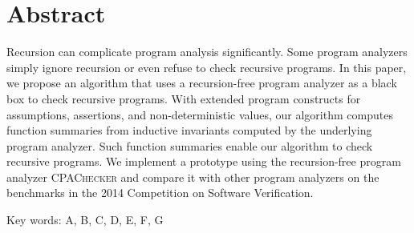 
\chapter{Abstract}

Recursion can complicate program analysis significantly. 
Some program analyzers simply ignore recursion or even refuse
to check recursive programs. In this paper, we propose an algorithm that uses
a recursion-free program analyzer as a black box to check recursive
programs. With extended program constructs for assumptions,
assertions, and non-deterministic values, our algorithm computes
function summaries from inductive invariants computed by the
underlying program analyzer. Such function summaries enable our
algorithm to check recursive programs. We implement a prototype using
the recursion-free program analyzer \textsc{CPAChecker} and compare it
with other program analyzers on the benchmarks in the 2014 Competition
on Software Verification.

Key words: A, B, C, D, E, F, G
